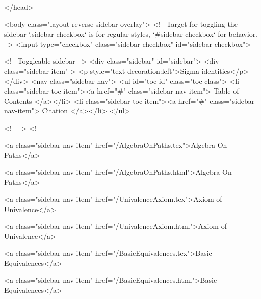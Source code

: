   
</head>




  <body class="layout-reverse sidebar-overlay">
    <!-- Target for toggling the sidebar `.sidebar-checkbox` is for regular
     styles, `#sidebar-checkbox` for behavior. -->
<input type="checkbox" class="sidebar-checkbox" id="sidebar-checkbox">

<!-- Toggleable sidebar -->
<div class="sidebar" id="sidebar">
  <div class="sidebar-item" >
    <p style="text-decoration:left">Sigma identities</p>
  </div>
  <nav class="sidebar-nav">
    <ul id="toc-id" class="toc-class">
  <li class="sidebar-toc-item"><a href="#" class="sidebar-nav-item"> Table of Contents </a></li>
  <li class="sidebar-toc-item"><a href="#" class="sidebar-nav-item"> Citation </a></li>
</ul>


    <!--  -->
    <!-- 
      
    
      
    
      
    
      
    
      
        
      
    
      
        
          <a class="sidebar-nav-item" href="/AlgebraOnPaths.tex">Algebra On Paths</a>
        
      
    
      
        
          <a class="sidebar-nav-item" href="/AlgebraOnPaths.html">Algebra On Paths</a>
        
      
    
      
        
          <a class="sidebar-nav-item" href="/UnivalenceAxiom.tex">Axiom of Univalence</a>
        
      
    
      
        
          <a class="sidebar-nav-item" href="/UnivalenceAxiom.html">Axiom of Univalence</a>
        
      
    
      
        
          <a class="sidebar-nav-item" href="/BasicEquivalences.tex">Basic Equivalences</a>
        
      
    
      
        
          <a class="sidebar-nav-item" href="/BasicEquivalences.html">Basic Equivalences</a>
        
